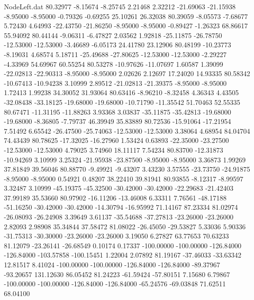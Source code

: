 \begin{filecontents}{NodeLeft.dat}
  80.32977   -8.15674   -8.25745     2.21468    2.32212  -21.69063  -21.15938   -8.95000   -8.95000   -0.79326   -0.69255   25.10261   26.32038
  80.39059   -8.05573   -7.68677     5.72430    4.64993  -22.43750  -21.86250   -8.95000   -8.95000   -0.89427   -1.26323   68.86617   55.94092
  80.44144   -9.06311   -6.47827     2.03562    1.92818  -25.11875  -26.78750  -12.53000  -12.53000   -3.46689   -6.05173   24.41780   23.12906
  80.48199  -10.23773   -8.19031     4.68574    5.18711  -25.49688  -27.80625  -12.53000  -12.53000   -2.29227   -4.33969   54.69967   60.55254
  80.53278  -10.97626  -11.07697     1.60587    1.39099  -22.02813  -22.90313   -8.95000   -8.95000    2.02626    2.12697   17.24020   14.93335
  80.58342  -10.67413  -10.94238     3.10999    2.89512  -21.02813  -21.39375   -8.95000   -8.95000    1.72413    1.99238   34.30052   31.93064
  80.63416   -8.96210   -8.32458     4.36343    4.43505  -32.08438  -33.18125  -19.68000  -19.68000  -10.71790  -11.35542   51.70463   52.55335
  80.67471  -11.31195  -11.88263     3.93368    3.03837  -35.11875  -35.42813  -19.68000  -19.68000   -8.36805   -7.79737   46.39949   35.83889
  80.72536  -15.91064  -17.21954     7.51492    6.65542  -26.47500  -25.74063  -12.53000  -12.53000    3.38064    4.68954   84.04704   74.43439
  80.78625  -17.32025  -16.27960     1.53424    0.63893  -22.35000  -23.27500  -12.53000  -12.53000    4.79025    3.74960   18.11117    7.54234
  80.83700  -12.31873  -10.94269     3.10999    3.25324  -21.95938  -23.87500   -8.95000   -8.95000    3.36873    1.99269   37.81849   39.56046
  80.88770   -9.49921   -9.43207     3.43230    3.57555  -23.73750  -24.91875   -8.95000   -8.95000    0.54921    0.48207   38.22410   39.81941
  80.93855   -8.12317   -8.99597     3.32487    3.10999  -45.19375  -45.32500  -30.42000  -30.42000  -22.29683  -21.42403   37.99189   35.53660
  80.97902  -16.11206  -13.46008     6.33311    7.76561  -48.17188  -51.16250  -30.42000  -30.42000  -14.30794  -16.95992   71.14167   87.23334
  81.02974  -26.08093  -26.24908     3.39649    3.61137  -35.54688  -37.27813  -23.26000  -23.26000    2.82093    2.98908   35.34844   37.58472
  81.08022  -26.45050  -29.53827     5.33036    5.90336  -31.75313  -30.30000  -23.26000  -23.26000    3.19050    6.27827   63.77653   70.63233
  81.12079  -23.26141  -26.68549     0.10174    0.17337 -100.00000 -100.00000 -126.84000 -126.84000 -103.57858 -100.15451    1.22004    2.07892
  81.19167  -37.46033  -33.63342    12.81517    8.41024 -100.00000 -100.00000 -126.84000 -126.84000  -89.37967  -93.20657  131.12630   86.05452
  81.24223  -61.59424  -57.80151     7.15680    6.79867 -100.00000 -100.00000 -126.84000 -126.84000  -65.24576  -69.03848   71.62511   68.04100

\end{filecontents}
